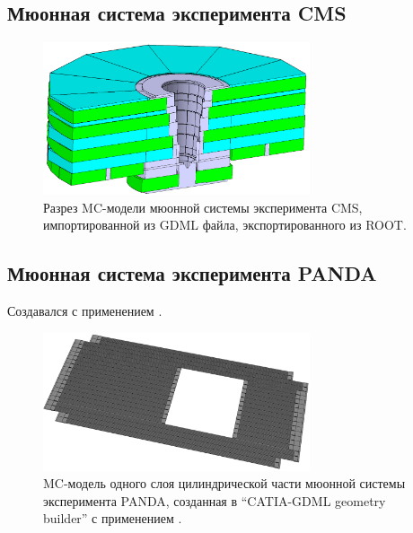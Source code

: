 \subsection{Мюонная система эксперимента CMS}\label{sec:secCmsMuon}


\begin{figure}[H]
\centering
\includegraphics[width=0.7\textwidth]{pictures/CMS_MUON.png}
\caption{Разрез MC-модели мюонной системы эксперимента CMS, импортированной из GDML файла, экспортированного из ROOT.}
\label{fig:CmsMuon}
\end{figure}

\subsection{Мюонная система эксперимента PANDA}\label{sec:secPandaMuon}

Создавался с применением .

\begin{figure}[H]
\centering
\includegraphics[width=0.7\textwidth]{pictures/PANDA_layer.png}
\caption{MC-модель одного слоя цилиндрической части мюонной системы эксперимента PANDA, созданная в ``CATIA-GDML geometry builder'' с применением .}
\label{fig:PandaMuonLayer}
\end{figure}

